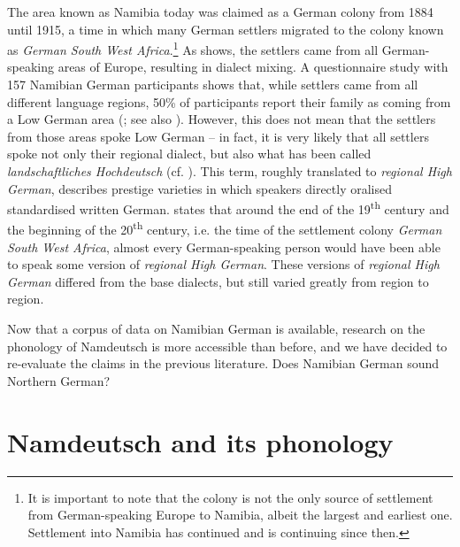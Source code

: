 \documentclass[output=paper]{langsci/langscibook}
\begin{document}
The area known as Namibia today was claimed as a German colony from 1884 until 1915, a time in which many German settlers migrated to the colony known as \textit{German South West Africa}.\footnote{It is important to note that the colony is not the only source of settlement from German-speaking Europe to Namibia, albeit the largest and earliest one. Settlement into Namibia has continued and is continuing since then.} As \citet{zimmer_siedlungsgeschichte_nodate} shows, the settlers came from all German-speaking areas of Europe, resulting in dialect mixing. A questionnaire study with 157 Namibian German participants shows that, while settlers came from all different language regions, 50\% of participants report their family as coming from a Low German area (\citealt{zimmer_siedlungsgeschichte_nodate}; see also \citealt{zimmer_wie_nodate}). However, this does not mean that the settlers from those areas spoke Low German – in fact, it is very likely that all settlers spoke not only their regional dialect, but also what has been called \textit{landschaftliches Hochdeutsch} (cf. \citealt{schmidt_sprachdynamik_2011}). This term, roughly translated to \textit{regional High German}, describes prestige varieties in which speakers directly oralised standardised written German. \citet[25]{ganswindt_landschaftliches_2017} states that around the end of the 19\textsuperscript{th} century and the beginning of the 20\textsuperscript{th} century, i.e. the time of the settlement colony \textit{German South West Africa}, almost every German-speaking person would have been able to speak some version of \textit{regional High German}. These versions of \textit{regional High German} differed from the base dialects, but still varied greatly from region to region.

Now that a corpus of data on Namibian German is available, research on the phonology of Namdeutsch is more accessible than before, and we have decided to re-evaluate the claims in the previous literature. Does Namibian German sound Northern German?

\section{Namdeutsch and its phonology}
\label{sec:stuhl:2}
\end{document}
